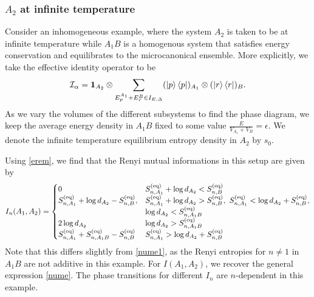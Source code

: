 \documentclass[a4paper,11pt]{article}
\newcommand{\HL}[1]{\textcolor{magenta}{#1}}
\newcommand{\be}{\begin{equation}}
\newcommand{\ee}{\end{equation}}
\newcommand\ep{\epsilon}
\newcommand\sI{{\ensuremath{{\mathcal I}}}}
\begin{document}
\begin{enumerate}
\subsubsection{$A_2$ at infinite temperature} 
 Consider an inhomogeneous example, where the system $A_2$ is taken to be at infinite temperature while $A_1 B$ is a homogenous system that satisfies energy conservation and equilibrates to the microcanonical ensemble. More explicitly, 
we take the effective identity operator to be 
\be 
\sI_{\alpha} = \mathbf{1}_{A_2} \otimes \sum_{E_p^{A_1} + E_r^B \in I_{E, \Delta}} (\ket{p}\bra{p})_{A_1} \otimes (\ket{r}\bra{r})_{B}. \label{mic_inf_temp}
\ee
As we vary the volumes of the different subsystems to find the phase diagram, we keep the average energy density in $A_1B$ fixed to some value $\frac{E}{V_{A_1}+V_B}=\epsilon$. We denote the infinite temperature equilibrium entropy density in $A_2$ by $s_0$. 

Using \eqref{erem}, we find that the Renyi mutual informations in this setup are given by 
\be 
I_n(A_1, A_2) = \label{in_mic2}
\begin{cases} 
 0 & S^{\rm (eq)}_{n, A_1} + \log d_{A_2} < S^{\rm (eq)}_{n, B} \\
 S^{\rm (eq)}_{n, A_1} +\log d_{A_2} - S^{\rm (eq)}_{n, B}, & S^{\rm (eq)}_{n, A_1} +\log d_{A_2} > S^{\rm (eq)}_{n, B}, ~ S^{\rm (eq)}_{n, A_1} < \log d_{A_2}+ S^{\rm (eq)}_{n, B}, \\
 &\log d_{A_2} < S^{\rm (eq)}_{n, A_1B} \\
 2 \log d_{A_2} & \log d_{A_2}> S^{\rm (eq)}_{n, A_1B} \\
 S_{n, A_1}^{\rm (eq)} + S_{n, A_1 B}^{\rm (eq)} - S_{n, B}^{\rm (eq)} & S^{\rm (eq)}_{n, A_1} > \log d_{A_2} + S^{\rm (eq)}_{n, B}
 \end{cases}
\ee
Note that this differs slightly from \eqref{nume1}, as the Renyi entropies for $n\neq 1$ in $A_1B$ are not additive in this example. For $I(A_1, A_2)$, we recover the general expression \eqref{nume}. The phase transitions for different $I_n$ are $n$-dependent in this example. 

\iffalse
We will denote the infinite temperature equilibrium entropy density in $A_2$ by $s_0$, and the equilibrium entropy density as a function of energy density in $A_1 B$ by $s(\epsilon)$, where $\ep$ is the average energy density in $A_1 B$. 

\HL{equivalently the total energy in $A_1 B$ to be $E = V (1-c(1-\lambda))\epsilon$. We will denote the density of states of subsystem $P$ at energy $E_P$ by $d_{P}^{E_P}$, and the Hilbert space dimension of $A_2$ by $d_{A_2}$.}
\fi


\end{enumerate}
\end{document}
